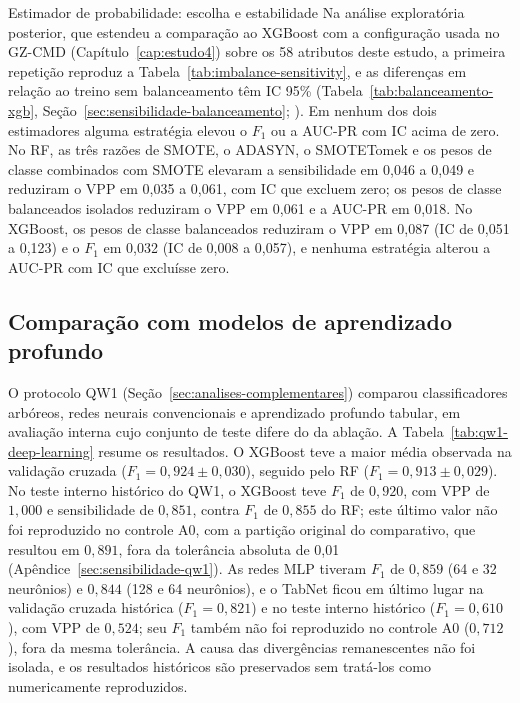 \begin{chapter}{Estimador de probabilidade: escolha e estabilidade}
Na análise exploratória posterior, que estendeu a comparação ao XGBoost com a configuração usada no GZ-CMD (Capítulo~\ref{cap:estudo4}) sobre os 58 atributos deste estudo, a primeira repetição reproduz a Tabela~\ref{tab:imbalance-sensitivity}, e as diferenças em relação ao treino sem balanceamento têm IC 95\% (Tabela~\ref{tab:balanceamento-xgb}, Seção~\ref{sec:sensibilidade-balanceamento}; ). Em nenhum dos dois estimadores alguma estratégia elevou o $F_1$ ou a AUC-PR com IC acima de zero. No RF, as três razões de SMOTE, o ADASYN, o SMOTETomek e os pesos de classe combinados com SMOTE elevaram a sensibilidade em 0,046 a 0,049 e reduziram o VPP em 0,035 a 0,061, com IC que excluem zero; os pesos de classe balanceados isolados reduziram o VPP em 0,061 e a AUC-PR em 0,018. No XGBoost, os pesos de classe balanceados reduziram o VPP em 0,087 (IC de 0,051 a 0,123) e o $F_1$ em 0,032 (IC de 0,008 a 0,057), e nenhuma estratégia alterou a AUC-PR com IC que excluísse zero.

\subsection{Comparação com modelos de aprendizado profundo}\label{sec:qw1-deep-learning}

O protocolo QW1 (Seção~\ref{sec:analises-complementares}) comparou classificadores arbóreos, redes neurais convencionais e aprendizado profundo tabular, em avaliação interna cujo conjunto de teste difere do da ablação. A Tabela~\ref{tab:qw1-deep-learning} resume os resultados. O XGBoost teve a maior média observada na validação cruzada ($F_1 = 0{,}924 \pm 0{,}030$), seguido pelo RF ($F_1 = 0{,}913 \pm 0{,}029$). No teste interno histórico do QW1, o XGBoost teve $F_1$ de $0{,}920$, com VPP de $1{,}000$ e sensibilidade de $0{,}851$, contra $F_1$ de $0{,}855$ do RF; este último valor não foi reproduzido no controle A0, com a partição original do comparativo, que resultou em $0{,}891$, fora da tolerância absoluta de 0,01 (Apêndice~\ref{sec:sensibilidade-qw1}). As redes MLP tiveram $F_1$ de $0{,}859$ (64 e 32 neurônios) e $0{,}844$ (128 e 64 neurônios), e o TabNet ficou em último lugar na validação cruzada histórica ($F_1 = 0{,}821$) e no teste interno histórico ($F_1 = 0{,}610$), com VPP de $0{,}524$; seu $F_1$ também não foi reproduzido no controle A0 ($0{,}712$), fora da mesma tolerância. A causa das divergências remanescentes não foi isolada, e os resultados históricos são preservados sem tratá-los como numericamente reproduzidos.


\end{chapter}

